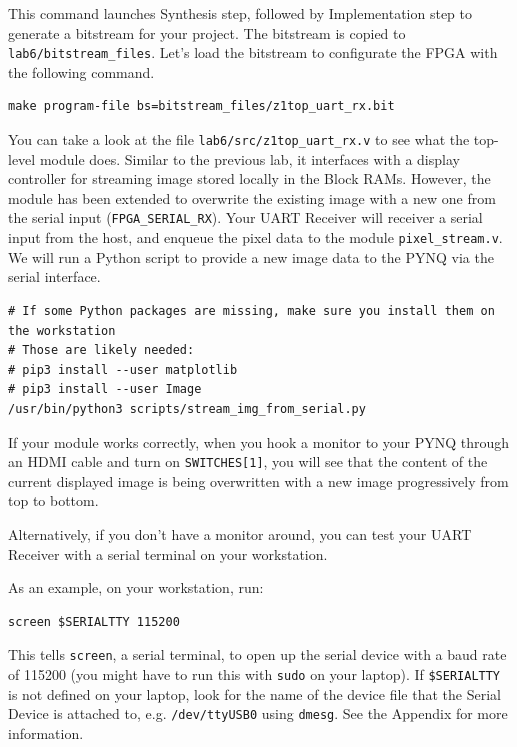 \documentclass[11pt]{article}
\begin{document}
This command launches Synthesis step, followed by Implementation step to generate a bitstream for your project. The bitstream is copied to \verb|lab6/bitstream_files|. Let's load the bitstream to configurate the FPGA with the following command.

\begin{verbatim}
make program-file bs=bitstream_files/z1top_uart_rx.bit
\end{verbatim}

You can take a look at the file \verb|lab6/src/z1top_uart_rx.v| to see what the top-level module does. Similar to the previous lab, it interfaces with a display controller for streaming image stored locally in the Block RAMs. However, the module has been extended to overwrite the existing image with a new one from the serial input (\verb|FPGA_SERIAL_RX|). Your UART Receiver will receiver a serial input from the host, and enqueue the pixel data to the module \verb|pixel_stream.v|. We will run a Python script to provide a new image data to the PYNQ via the serial interface.

\begin{verbatim}
# If some Python packages are missing, make sure you install them on the workstation
# Those are likely needed:
# pip3 install --user matplotlib
# pip3 install --user Image
/usr/bin/python3 scripts/stream_img_from_serial.py
\end{verbatim}

If your module works correctly, when you hook a monitor to your PYNQ through an HDMI cable and turn on \verb|SWITCHES[1]|, you will see that the content of the current displayed image is being overwritten with a new image progressively from top to bottom.

Alternatively, if you don't have a monitor around, you can test your UART Receiver with a serial terminal on your workstation.

As an example, on your workstation, run:

\begin{verbatim}
screen $SERIALTTY 115200
\end{verbatim}

This tells \verb|screen|, a serial terminal, to open up the serial device with a baud rate of 115200 (you might have to run this with \verb|sudo| on your laptop). If \verb|$SERIALTTY| is not defined on your laptop, look for the name of the device file that the Serial Device is attached to, e.g. \verb|/dev/ttyUSB0| using \texttt{dmesg}. See the Appendix for more information.
\end{document}
